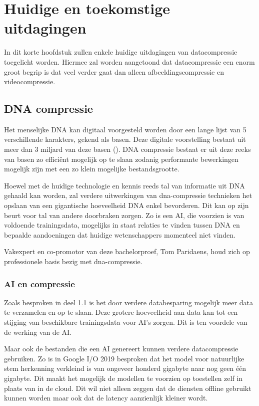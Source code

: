 \chapter{Huidige en toekomstige uitdagingen}
\label{ch:uitdagingen}

In dit korte hoofdstuk zullen enkele huidige uitdagingen van \gls{datacompressie} toegelicht worden. Hiermee zal worden aangetoond dat \gls{datacompressie} een enorm groot begrip is dat veel verder gaat dan alleen \gls{afbeeldingscompressie} en \gls{videocompressie}.

\section{DNA compressie}
\label{sec:uitdagingen-dna-compressie}

Het menselijke DNA kan digitaal voorgesteld worden door een lange lijst van 5 verschillende karakters, gekend als basen. Deze digitale voorstelling bestaat uit meer dan 3 miljard van deze basen (\cite{dodanaugent2011}). DNA compressie bestaat er uit deze reeks van basen zo efficiënt mogelijk op te slaan zodanig performante bewerkingen mogelijk zijn met een zo klein mogelijke bestandsgrootte.

Hoewel met de huidige technologie en kennis reeds tal van informatie uit DNA gehaald kan worden, zal verdere uitwerkingen van \gls{dna-compressie} technieken het opslaan van een gigantische hoeveelheid DNA enkel bevorderen.  Dit kan op zijn beurt voor tal van andere doorbraken zorgen. Zo is een AI, die voorzien is van voldoende trainingsdata, mogelijks in staat relaties te vinden tussen DNA en bepaalde aandoeningen dat huidige wetenschappers momenteel niet vinden.

Vakexpert en co-promotor van deze bachelorproef, Tom Paridaens, houd zich op professionele basis bezig met \gls{dna-compressie}.

\subsection{AI en compressie}
\label{sec:uitdagingen-ai}

Zoals besproken in deel \ref{sec:uitdagingen-dna-compressie} is het door verdere databesparing mogelijk meer data te verzamelen en op te slaan. Deze grotere hoeveelheid aan data kan tot een stijging van beschikbare trainingsdata voor AI's zorgen. Dit is ten voordele van de werking van de AI.

Maar ook de bestanden die een AI genereert kunnen verdere \gls{datacompressie} gebruiken. Zo is in Google I/O 2019 besproken dat het model voor natuurlijke stem herkenning verkleind is van ongeveer honderd gigabyte naar nog geen één gigabyte. Dit maakt het mogelijk de modellen te voorzien op toestellen zelf in plaats van in de cloud. Dit wil niet alleen zeggen dat de diensten offline gebruikt kunnen worden maar ook dat de latency aanzienlijk kleiner wordt. 

